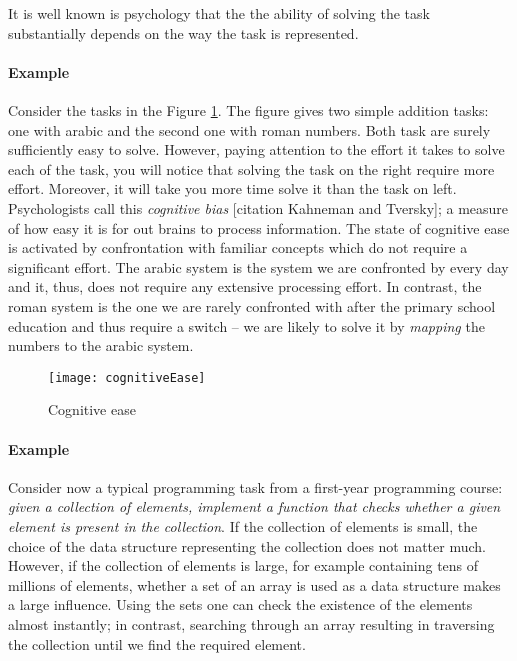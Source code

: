 It is well known is psychology that the the ability of solving the task substantially depends on the way the task is represented.

\paragraph{Example} Consider the tasks in the Figure \ref{fig:cogease}.
The figure gives two simple addition tasks: one with arabic and the second one with roman numbers.
Both task are surely sufficiently easy to solve. 
However, paying attention to the effort it takes to solve each of the task, you will notice that solving the task on the right require more effort.
Moreover, it will take you more time solve it than the task on left.
Psychologists call this \textit{cognitive bias} [citation Kahneman and Tversky]; a measure of how easy it is for out brains to process information.
The state of cognitive ease is activated by confrontation with familiar concepts which do not require a significant effort.
The arabic system is the system we are confronted by every day and it, thus, does not require any extensive processing effort.
In contrast, the roman system is the one we are rarely confronted with after the primary school education and thus require a switch -- we are likely to solve it by \textit{mapping} the numbers to the arabic system.


 


\begin{figure}
	\centering
	\texttt{[image: cognitiveEase]}
	\caption{Cognitive ease}
	\label{fig:cogease}
\end{figure}



\paragraph{Example} Consider now a typical programming task from a first-year programming course: \textit{given a collection of elements, implement a function that checks whether a given element is present in the collection}.
If the collection of elements is small, the choice of the data structure representing the collection does not matter much.
However, if the collection of elements is large, for example containing tens of millions of elements, whether a set of an array is used as a data structure makes a large influence.
Using the sets one can check the existence of the elements almost instantly; in contrast, searching through an array resulting in traversing the collection until we find the required element.


